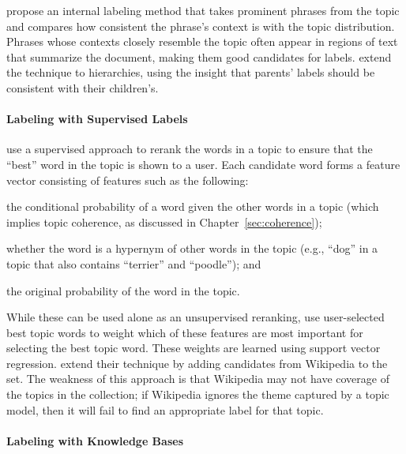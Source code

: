 \citet{mei-07} propose an internal labeling method that takes
prominent phrases from the topic and compares how consistent the
phrase's context is with the topic distribution.  Phrases whose
contexts closely resemble the topic often appear in regions of text
that summarize the document, making them good candidates for labels.
\citet{mao-12} extend the technique to hierarchies, using the insight
that parents' labels should be consistent with their children's.



\paragraph{Labeling with Supervised Labels}


\citet{lau-10} use a supervised approach to rerank the words in a
topic to ensure that the ``best'' word in the topic is shown to a
user. Each candidate word forms a feature vector consisting of
features such as the following:
\begin{itemize*}
\item the conditional probability of a word given the other words in a
  topic (which implies topic coherence, as discussed in
Chapter~\ref{sec:coherence});
\item whether the word is a hypernym of other words in the topic
  (e.g., ``dog'' in a topic that also contains ``terrier'' and
  ``poodle''); and
\item the original probability of the word in the topic.
\end{itemize*}

While these can be used alone as an unsupervised reranking,
\citet{lau-10} use user-selected best topic words to weight which of
these features are most important for selecting the best topic word.
These weights are learned using support vector regression.
\citet{lau-11} extend their technique by adding candidates from
Wikipedia to the set.
The weakness of this approach is that Wikipedia may not have coverage
of the topics in the collection; if Wikipedia ignores the theme
captured by a topic model, then it will fail to find an appropriate
label for that topic.

\paragraph{Labeling with Knowledge Bases}

